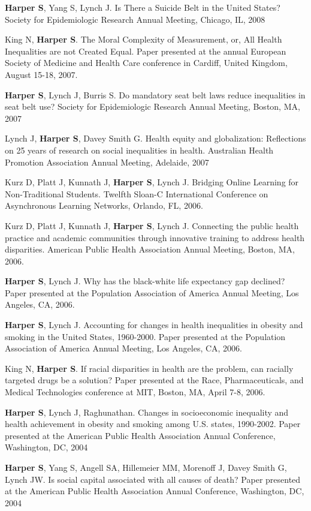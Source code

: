 \documentclass[
  letterpaper,
  DIV=11,
  numbers=noendperiod]{scrartcl}
\begin{document}
\textbf{Harper S}, Yang S, Lynch J. Is There a Suicide Belt in the
United States? Society for Epidemiologic Research Annual Meeting,
Chicago, IL, 2008

King N, \textbf{Harper S}. The Moral Complexity of Measurement, or, All
Health Inequalities are not Created Equal. Paper presented at the annual
European Society of Medicine and Health Care conference in Cardiff,
United Kingdom, August 15-18, 2007.

\textbf{Harper S}, Lynch J, Burris S. Do mandatory seat belt laws reduce
inequalities in seat belt use? Society for Epidemiologic Research Annual
Meeting, Boston, MA, 2007

Lynch J, \textbf{Harper S}, Davey Smith G. Health equity and
globalization: Reflections on 25 years of research on social
inequalities in health. Australian Health Promotion Association Annual
Meeting, Adelaide, 2007

Kurz D, Platt J, Kunnath J, \textbf{Harper S}, Lynch J. Bridging Online
Learning for Non-Traditional Students. Twelfth Sloan-C International
Conference on Asynchronous Learning Networks, Orlando, FL, 2006.

Kurz D, Platt J, Kunnath J, \textbf{Harper S}, Lynch J. Connecting the
public health practice and academic communities through innovative
training to address health disparities. American Public Health
Association Annual Meeting, Boston, MA, 2006.

\textbf{Harper S}, Lynch J. Why has the black-white life expectancy gap
declined? Paper presented at the Population Association of America
Annual Meeting, Los Angeles, CA, 2006.

\textbf{Harper S}, Lynch J. Accounting for changes in health
inequalities in obesity and smoking in the United States, 1960-2000.
Paper presented at the Population Association of America Annual Meeting,
Los Angeles, CA, 2006.

King N, \textbf{Harper S}. If racial disparities in health are the
problem, can racially targeted drugs be a solution? Paper presented at
the Race, Pharmaceuticals, and Medical Technologies conference at MIT,
Boston, MA, April 7-8, 2006.

\textbf{Harper S}, Lynch J, Raghunathan. Changes in socioeconomic
inequality and health achievement in obesity and smoking among U.S.
states, 1990-2002. Paper presented at the American Public Health
Association Annual Conference, Washington, DC, 2004

\textbf{Harper S}, Yang S, Angell SA, Hillemeier MM, Morenoff J, Davey
Smith G, Lynch JW. Is social capital associated with all causes of
death? Paper presented at the American Public Health Association Annual
Conference, Washington, DC, 2004
\end{document}
